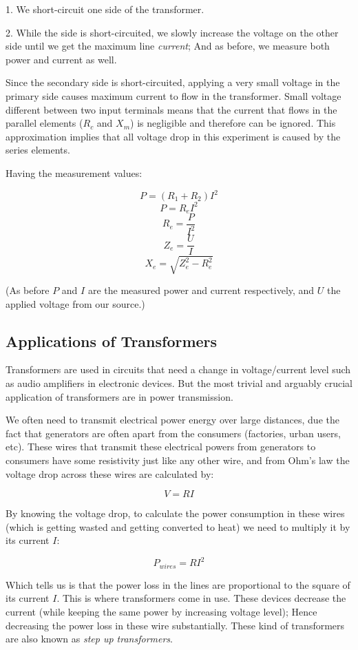 \documentclass{article}
\begin{document}
	1. We short-circuit one side of the transformer.

	2. While the side is short-circuited, we slowly increase the voltage on the other side until we get the maximum line \textit{current}; And as before, we measure both power and current as well.

	Since the secondary side is short-circuited, applying a very small voltage in the primary side causes maximum current to flow in the transformer.
	Small voltage different between two input terminals means that the current that flows in the parallel elements ($R_c$ and $X_m$) is negligible and therefore can be ignored.
	This approximation implies that all voltage drop in this experiment is caused by the series elements.
	
	Having the measurement values:
	
	$$ P = (R_1 + R_2)I^2 $$
	$$ P = R_e I^2 $$
	$$ R_e = \frac{P}{I^2} $$
	$$ Z_e = \frac{U}{I} $$
	$$ X_e = \sqrt{Z_e^2 - R_e^2}$$

	(As before $P$ and $I$ are the measured power and current respectively, and $U$ the applied voltage from our source.)
	
	
	\subsection{Applications of Transformers}
	Transformers are used in circuits that need a change in voltage/current level such as audio amplifiers in electronic devices.
	But the most trivial and arguably crucial application of transformers are in power transmission. 
	
	We often need to transmit electrical power energy over large distances, due the fact that generators are often apart from the consumers (factories, urban users, etc). These wires that transmit these electrical powers from generators to consumers have some resistivity just like any other wire, and from Ohm's law the voltage drop across these wires are calculated by:
	
	$$V = RI$$
	
	By knowing the voltage drop, to calculate the power consumption in these wires (which is getting wasted and getting converted to heat) we need to multiply it by its current $I$:
	
	$$P_{wires} = RI^2 $$
	
	Which tells us is that the power loss in the lines are proportional to the square of its current $I$.
	This is where transformers come in use.
	These devices decrease the current (while keeping the same power by increasing voltage level); Hence decreasing the power loss in these wire substantially.
	These kind of transformers are also known as \textit{step up transformers}.
	
\end{document}
